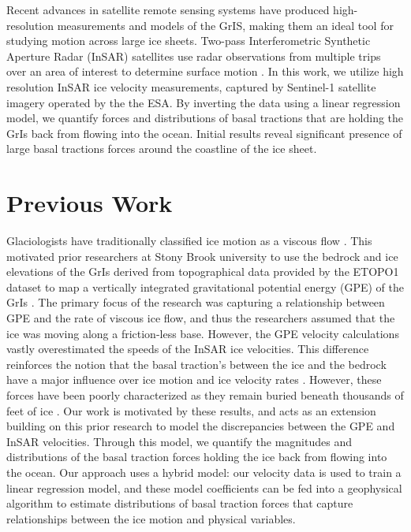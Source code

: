 \documentclass{article}
\begin{document}
Recent advances in satellite remote sensing systems have produced high-resolution measurements and models of the GrIS, making them an ideal tool for studying motion across large ice sheets. Two-pass Interferometric Synthetic Aperture Radar (InSAR) satellites use radar observations from multiple trips over an area of interest to determine surface motion \cite{wild_differential_2019}. In this work, we utilize high resolution InSAR ice velocity measurements, captured by Sentinel-1 satellite imagery operated by the the ESA. By inverting the data using a linear regression model, we quantify forces and distributions of basal tractions that are holding the GrIs back from flowing into the ocean. Initial results reveal significant presence of large basal tractions forces around the coastline of the ice sheet.

\section{Previous Work}

Glaciologists have traditionally classified ice motion as a viscous flow \cite{morland_steady_1980}. This motivated prior researchers at Stony Brook university to use the bedrock and ice elevations of the GrIs derived from topographical data provided by the ETOPO1 dataset to map a vertically integrated gravitational potential energy (GPE) of the GrIs \cite{information_ncei_etopo1_nodate}. The primary focus of the research was capturing a relationship between GPE and the rate of viscous ice flow, and thus the researchers assumed that the ice was moving along a friction-less base. However, the GPE velocity calculations vastly overestimated the speeds of the InSAR ice velocities. This difference reinforces the notion that the basal traction's between the ice and the bedrock have a major influence over ice motion and ice velocity rates \cite{maier_basal_2021}. However, these forces have been poorly characterized as they remain buried beneath thousands of feet of ice \cite{maier_basal_2021}. Our work is motivated by these results, and acts as an extension building on this prior research to model the discrepancies between the GPE and InSAR velocities. Through this model, we quantify the magnitudes and distributions of the basal traction forces holding the ice back from flowing into the ocean. Our approach uses a hybrid model: our velocity data is used to train a linear regression model, and these model coefficients can be fed into a geophysical algorithm to estimate distributions of basal traction forces that capture relationships between the ice motion and physical variables.
\end{document}
